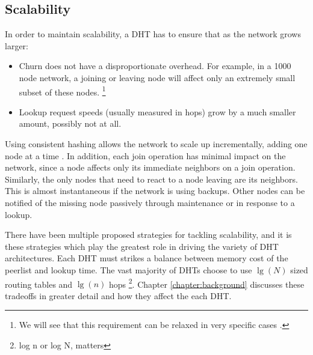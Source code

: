 \documentclass[10pt,letterpaper,twoside]{report}
\begin{document}
\subsection{Scalability}
\label{subsec:scalability}
In order to maintain scalability, a DHT has to ensure that as the network grows larger:

\begin{itemize}
    \item Churn does not have a disproportionate overhead.  
    For example, in a 1000 node network, a joining or leaving node will affect only an extremely small subset of these nodes.
    \footnote{We will see that this requirement can  be  relaxed in  very specific cases \cite{li2013zht}.}
    \item Lookup request speeds (usually measured in hops) grow by a much smaller amount, possibly not at all.
\end{itemize}

Using consistent hashing allows the network to scale up incrementally, adding one node at a time \cite{dynamo}.
In addition, each join operation has minimal impact on the network, since a node affects only its immediate neighbors on a join operation.
Similarly, the only nodes that need to react to a node leaving are its neighbors.
This is almost instantaneous if the network is using backups.
Other nodes can be notified of the missing node passively through maintenance or in response to a lookup.

There have been multiple proposed strategies for tackling scalability, and it is these strategies which play the greatest role in driving the variety of DHT architectures. 
Each DHT must strikes a balance between memory cost of the peerlist and lookup time. 
The vast majority of DHTs choose to use $\lg(N)$ sized routing tables and  $\lg(n)$ hops \footnote{log n or log N, matters}. 
Chapter \ref{chapter:background} discusses these tradeoffs in greater detail and how they affect the each DHT.
\end{document}
